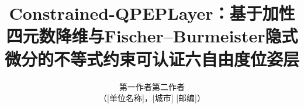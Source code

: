\documentclass[twocolumn,10pt]{ctexart}
\begin{document}

\title{\bfseries Constrained-QPEPLayer：基于加性四元数降维与Fischer--Burmeister隐式微分的不等式约束可认证六自由度位姿层}
\author{ 第一作者\quad 第二作者\\[2pt] （[单位名称]，[城市] [邮编]）}
\date{}
\maketitle

\begin{abstract}

\end{abstract}











\clearpage
\appendix


\clearpage
{

}
\end{document}
